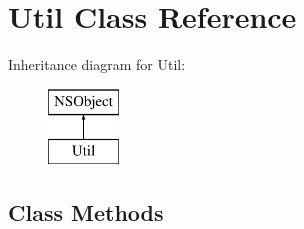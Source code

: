 \hypertarget{interface_util}{\section{Util Class Reference}
\label{interface_util}
}
Inheritance diagram for Util\+:\begin{figure}[H]
\begin{center}
\leavevmode
\includegraphics[height=2.000000cm]{interface_util}
\end{center}
\end{figure}
\subsection*{Class Methods}
